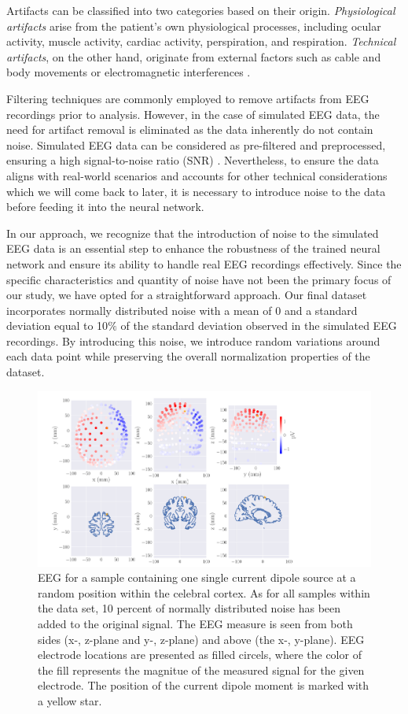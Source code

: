\documentclass[a4paper, UKenglish, 11pt]{uiomaster}
\begin{document}
Artifacts can be classified into two categories based on their origin. \emph{Physiological artifacts} arise from the patient's own physiological processes, including ocular activity, muscle activity, cardiac activity, perspiration, and respiration. \emph{Technical artifacts}, on the other hand, originate from external factors such as cable and body movements or electromagnetic interferences \cite{bitbrain}.

Filtering techniques are commonly employed to remove artifacts from EEG recordings prior to analysis. However, in the case of simulated EEG data, the need for artifact removal is eliminated as the data inherently do not contain noise. Simulated EEG data can be considered as pre-filtered and preprocessed, ensuring a high signal-to-noise ratio (SNR) \cite{wiki-snr}. Nevertheless, to ensure the data aligns with real-world scenarios and accounts for other technical considerations which we will come back to later, it is necessary to introduce noise to the data before feeding it into the neural network.

In our approach, we recognize that the introduction of noise to the simulated EEG data is an essential step to enhance the robustness of the trained neural network and ensure its ability to handle real EEG recordings effectively. Since the specific characteristics and quantity of noise have not been the primary focus of our study, we have opted for a straightforward approach. Our final dataset incorporates normally distributed noise with a mean of 0 and a standard deviation equal to 10$\%$ of the standard deviation observed in the simulated EEG recordings. By introducing this noise, we introduce random variations around each data point while preserving the overall normalization properties of the dataset.

\begin{figure}[!htb]
    \centering
    \includegraphics[width=\linewidth]{figures/simple_example.pdf}
    \caption{EEG for a sample containing one single current dipole source at a random position within the celebral cortex. As for all samples within the data set, 10 percent of normally distributed noise has been added to the original signal. The EEG measure is seen from both sides (x-, z-plane and y-, z-plane) and above (the x-, y-plane). EEG electrode locations are presented as filled circels, where the color of the fill represents the magnitue of the measured signal for the given electrode. The position of the current dipole moment is marked with a yellow star.}
    \label{fig:eeg_field_1_dipole_example}
\end{figure}
\end{document}
